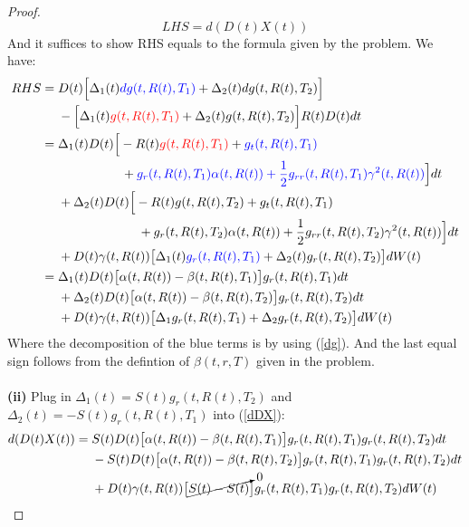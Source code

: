 \documentclass[a4paper, 10pt]{article}
\theoremstyle{definition}
\theoremstyle{hSol}
\begin{document}
\begin{proof}
$$LHS = d(D(t)X(t))$$
And it suffices to show RHS equals to the formula given by the problem. We have: 
\begin{equation}\label{dDX}
  \begin{split}
    RHS &= D(t)\Big[\Delta_1(t)\textcolor{blue}{dg(t,R(t), T_1)} + \Delta_2(t)dg(t,R(t), T_2)\Big] \\
    &~~~~-\Big[\Delta_1(t)\textcolor{red}{g(t,R(t), T_1)}+\Delta_2(t)g(t,R(t), T_2)\Big]R(t)D(t)dt\\
    &= \Delta_1(t)D(t) \Big[-R(t)\textcolor{red}{g(t,R(t), T_1)}+\textcolor{blue}{g_t(t,R(t),T_1)}  \\
    &\qquad\qquad\qquad~+ \textcolor{blue}{g_r(t,R(t),T_1) \alpha(t,R(t)) + \frac{1}{2}g_{rr}(t,R(t),T_1)\gamma^2(t,R(t))} \Big]dt\\
    &~~~~+ \Delta_2(t)D(t) \Big[-R(t)g(t,R(t), T_2)+g_t(t,R(t),T_1)  \\
    &\qquad\qquad\qquad\quad~~+ g_r(t,R(t),T_2) \alpha(t,R(t)) + \frac{1}{2}g_{rr}(t,R(t),T_2)\gamma^2(t,R(t)) \Big]dt\\
    &~~~~+ D(t)\gamma(t,R(t))\big[\Delta_1(t) \textcolor{blue}{g_r(t,R(t),T_1)}+\Delta_2(t) g_r(t,R(t),T_2)\big] dW(t)\\
    &= \Delta_1(t)D(t)\big[\alpha(t,R(t))-\beta(t,R(t),T_1)\big]g_r(t,R(t),T_1)dt \\
    &~~~~+ \Delta_2(t)D(t)\big[\alpha(t,R(t))-\beta(t,R(t),T_2)\big]g_r(t,R(t),T_2)dt\\
    &~~~~+ D(t)\gamma(t,R(t))\big[\Delta_1 g_r(t,R(t),T_1)+\Delta_2 g_r(t,R(t),T_2)\big] dW(t)
  \end{split}
\end{equation}
Where the decomposition of the blue terms is by using (\ref{dg}). And the last equal sign follows from the defintion of $\beta(t,r,T)$ given in the problem.\\
~\\
\textbf{(ii)} Plug in $\Delta_1(t) =S(t)g_r(t,R(t),T_2)$ and $\Delta_2(t)=-S(t)g_r(t,R(t),T_1)$ into (\ref{dDX}):
\begin{equation}
  \begin{split}
    d(D(t)X(t)) &=S(t)D(t)\big[\alpha(t,R(t))-\beta(t,R(t),T_1)\big]g_r(t,R(t),T_1)g_r(t,R(t),T_2)dt \\
    &~~~~- S(t)D(t)\big[\alpha(t,R(t))-\beta(t,R(t),T_2)\big]g_r(t,R(t),T_1)g_r(t,R(t),T_2)dt\\
    &~~~~+ D(t)\gamma(t,R(t))\big[\cancelto{0}{S(t)-S(t)}\big] g_r(t,R(t),T_1)g_r(t,R(t),T_2)dW(t) \\

\end{split}
\end{equation}
\end{proof}
\end{document}
